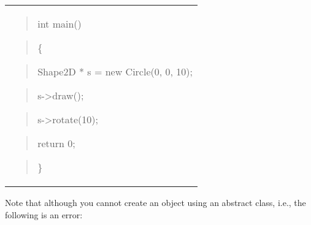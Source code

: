 \documentclass[
]{article}
\begin{document}
\begin{longtable}[]{@{}
  >{\raggedright\arraybackslash}p{}@{}}
\begin{quote}
\end{quote}

\begin{quote}
int main()
\end{quote}

\begin{quote}
\{\textbf{ }
\end{quote}

\begin{quote}
Shape2D * s = new Circle(0, 0, 10);
\end{quote}

\begin{quote}
\textbf{ }s-\textgreater draw();
\end{quote}

\begin{quote}
s-\textgreater rotate(10);
\end{quote}

\begin{quote}
return 0;
\end{quote}

\begin{quote}
\}
\end{quote} \\
\end{longtable}

Note that although you cannot create an object using an abstract class,
i.e., the following is an error:
\end{document}
